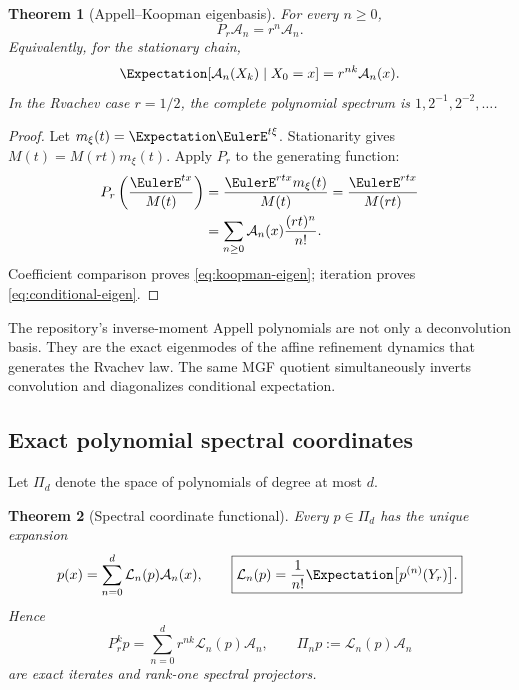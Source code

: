 \documentclass[11pt,a4paper]{article}
\newtheorem{theorem}{Theorem}[section]
\theoremstyle{definition}
\theoremstyle{remark}
\newcommand{\Acal}{\mathcal A}
\newcommand{\Lcal}{\mathcal L}
\newcommand{\PiD}{\Pi}
\begin{document}
\begin{theorem}[Appell--Koopman eigenbasis]
\label{thm:koopman-eigen}
For every $n\ge0$,
\begin{equation}
 P_r\Acal_n=r^n\Acal_n.
 \label{eq:koopman-eigen}
\end{equation}
Equivalently, for the stationary chain,
\begin{equation}
 \Expectation[\Acal_n(X_k)\mid X_0=x]=r^{nk}\Acal_n(x).
 \label{eq:conditional-eigen}
\end{equation}
In the Rvachev case $r=1/2$, the complete polynomial spectrum is $1,2^{-1},2^{-2},\ldots$.
\end{theorem}

\begin{proof}
Let $m_\xi(t)=\Expectation\EulerE^{t\xi}$. Stationarity gives $M(t)=M(rt)m_\xi(t)$. Apply $P_r$ to the generating function:
\begin{align*}
 P_r\left(\frac{\EulerE^{tx}}{M(t)}\right)
 &=\frac{\EulerE^{rtx}m_\xi(t)}{M(t)}
 =\frac{\EulerE^{rtx}}{M(rt)}\\
 &=\sum_{n\ge0}\Acal_n(x)\frac{(rt)^n}{n!}.
\end{align*}
Coefficient comparison proves \eqref{eq:koopman-eigen}; iteration proves \eqref{eq:conditional-eigen}.
\end{proof}

\begin{resultbox}
The repository's inverse-moment Appell polynomials are not only a deconvolution basis. They are the exact eigenmodes of the affine refinement dynamics that generates the Rvachev law. The same MGF quotient simultaneously inverts convolution and diagonalizes conditional expectation.
\end{resultbox}

\subsection{Exact polynomial spectral coordinates}

Let $\Pi_d$ denote the space of polynomials of degree at most $d$.

\begin{theorem}[Spectral coordinate functional]
\label{thm:spectral-coordinate}
Every $p\in\Pi_d$ has the unique expansion
\begin{equation}
 p(x)=\sum_{n=0}^{d}\Lcal_n(p)\Acal_n(x),
 \qquad
 \boxed{\displaystyle
 \Lcal_n(p)=\frac1{n!}\Expectation\bigl[p^{(n)}(Y_r)\bigr].}
 \label{eq:spectral-coordinate}
\end{equation}
Hence
\begin{equation}
 P_r^kp=\sum_{n=0}^{d}r^{nk}\Lcal_n(p)\Acal_n,
 \qquad
 \PiD_np:=\Lcal_n(p)\Acal_n
 \label{eq:iterate-projectors}
\end{equation}
are exact iterates and rank-one spectral projectors.
\end{theorem}
\end{document}
